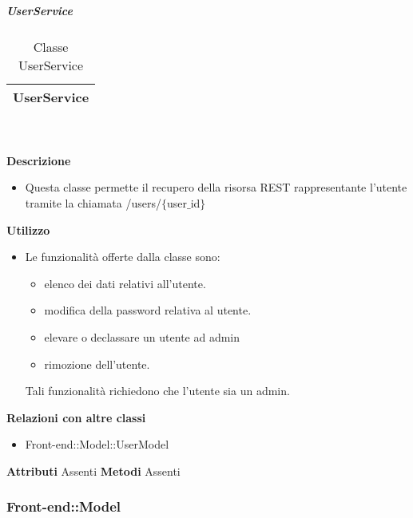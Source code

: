 			\subparagraph{UserService} 
\begin{table}[ht]
\begin{center}
\bgroup
	\setlength{\arrayrulewidth}{0.6mm}
	\def\arraystretch{1}
		\begin{tabular}{ | p{12cm} | }
				\hline  
					\centerline{\textbf{UserService}}
		\\ \hline 
				\hline
				\hline
		
		\end{tabular}
\egroup
\caption{Classe UserService}
\end{center}
\end{table} \textbf{\\ \\ Descrizione}
\begin{itemize}
\item[] Questa classe permette il recupero della risorsa REST rappresentante l'utente tramite la chiamata /users/$\{$user$\_$id$\}$
\end{itemize} 
\textbf{Utilizzo}
\begin{itemize}
\item[] Le funzionalità offerte dalla classe sono: 
\begin{itemize} 
\item elenco dei dati relativi all'utente. 
\item modifica della password relativa al utente.
\item elevare o declassare un utente ad admin 
\item rimozione dell'utente.
\end{itemize}
Tali funzionalità richiedono che l'utente sia un admin.
\end{itemize}
\textbf{Relazioni con altre classi}
\begin{itemize}
\item{Front-end::Model::UserModel}
\end{itemize}
\textbf{Attributi}
Assenti
\textbf{Metodi}
Assenti

	\subsubsection{Front-end::Model} 
